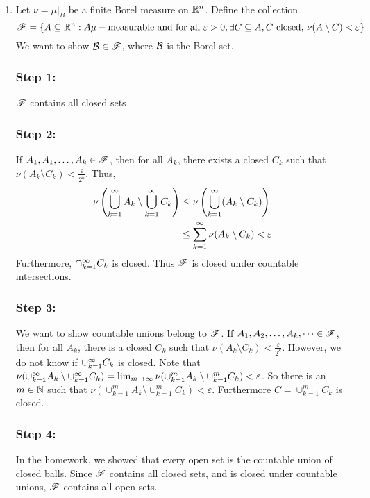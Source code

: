 \documentclass[x11names,reqno,14pt]{extarticle}
\newcommand{\seq}[2][\oo]{_{#2 = 1}^#1}
\newcommand{\cupk}[1][\oo]{\cup\seq[#1]{k}}
\newcommand{\bigcupk}[1][\oo]{\bigcup\seq[#1]{k}}
\newcommand{\capk}[1][\oo]{\cap\seq[#1]{k}}
\newcommand{\bigcapk}[1][\oo]{\bigcup\seq[#1]{k}}
\begin{document}
\proof
\,
\begin{enumerate}

\item Let $\nu = \mu|_B$ be a finite Borel measure on $\mathbb{R}^n$.  Define the collection
\[
\mathscr{F} = \{A\subseteq \mathbb{R}^n:A \mu-\text{measurable and for all }\varepsilon>0,\exists C \subseteq A, C\text{ closed, }\nu(A\setminus C)<\varepsilon\} 
\]
We want to show $\mathcal{B} \in \mathscr{F}$, where $\mathcal{B}$ is the Borel set. 

\subsubsection*{Step 1:} $\mathscr{F}$ contains all closed sets

\subsubsection*{Step 2:} If $A_1, A_1, \dots, A_k \in \mathscr{F}$, then for all $A_k$, there exists a closed $C_k$ such that $\nu(A_k\setminus C_k)<\frac{\varepsilon}{2^k}$. Thus, 
\begin{align*}
\nu\left(\bigcapk A_k\setminus \bigcapk C_k\right) & \leq \nu\left(\bigcupk(A_k\setminus C_k)\right) \\
& \leq \sum_{k=1}^\oo\nu(A_k\setminus C_k) < \varepsilon \\
\end{align*}
Furthermore, $\capk C_k$ is closed. Thus $\mathscr{F}$ is closed under countable intersections. 

\subsubsection*{Step 3:} We want to show countable unions belong to $\mathscr{F}$. If $A_1, A_2, \dots, A_k, \dots \in \mathscr{F}$, then for all $A_k$, there is a closed $C_k$ such that $\nu(A_k\setminus C_k)<\frac{\varepsilon}{2^k}$. However, we do not know if $\cupk C_k$ is closed. Note that $\nu(\cupk A_k \setminus \cupk C_k) = \lim_{m\to\oo}\nu(\cup_{k=1}^m A_k \setminus \cup_{k=1}^m C_k) < \varepsilon$. So there is an $m \in \mathbb{N}$ such that $\nu(\cup_{k=1}^m A_k \setminus \cup_{k=1}^m C_k) < \varepsilon$. Furthermore $C = \cupk[m]C_k$ is closed. 

\subsubsection*{Step 4:} In the homework, we showed that every open set is the countable union of closed balls. Since $\mathscr{F}$ contains all closed sets, and is closed under countable unions, $\mathscr{F}$ contains all open sets. 


\end{enumerate}
\end{document}
